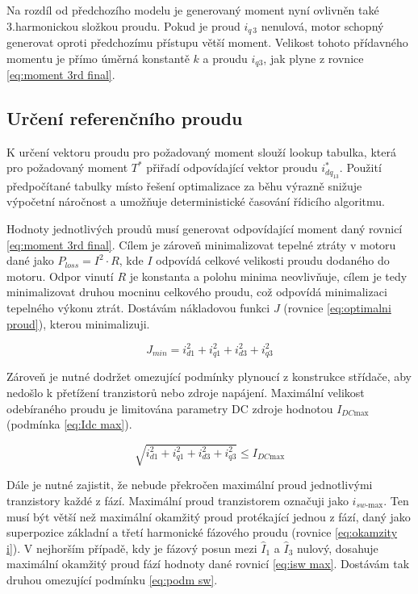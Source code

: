 Na rozdíl od předchozího modelu je generovaný moment nyní ovlivněn také 3.harmonickou složkou proudu. Pokud je proud $i_{q\,3}$ nenulová, motor schopný generovat oproti předchozímu přístupu větší moment. Velikost tohoto přídavného momentu je přímo úměrná konstantě $k$ a proudu $i_{q3}$, jak plyne z rovnice \ref{eq:moment 3rd final}. 



\subsection{Určení referenčního proudu}
K určení vektoru proudu pro požadovaný moment slouží lookup tabulka, která pro požadovaný moment $T^*$ přiřadí odpovídající vektor proudu $i_{dq_{13}}^*$. Použití předpočítané tabulky místo řešení optimalizace za běhu výrazně snižuje výpočetní náročnost a umožňuje deterministické časování řídicího algoritmu.

Hodnoty jednotlivých proudů musí generovat odpovídající moment daný  rovnicí \ref{eq:moment 3rd final}. Cílem je zároveň minimalizovat tepelné ztráty v motoru dané jako $P_{loss} = I^2 \cdot R$, kde $I$ odpovídá celkové velikosti proudu dodaného do motoru. Odpor vinutí $R$ je konstanta a polohu minima neovlivňuje, cílem je tedy minimalizovat druhou mocninu celkového proudu, což odpovídá minimalizaci tepelného výkonu ztrát. Dostávám nákladovou funkci $J$ (rovnice \ref{eq:optimalni proud}), kterou minimalizuji.

\begin{equation}
    \label{eq:optimalni proud}
    J_{min} = i_{d1}^2 + i_{q1}^2 + i_{d3}^2 + i_{q3}^2
\end{equation}

Zároveň je nutné dodržet omezující podmínky plynoucí z konstrukce střídače, aby nedošlo k přetížení tranzistorů nebo zdroje napájení. Maximální velikost odebíraného proudu je limitována parametry DC zdroje hodnotou $I_{DC\text{max}}$ (podmínka \ref{eq:Idc max}).

\begin{equation}
    \label{eq:Idc max}
    \sqrt{i_{d1}^2 + i_{q1}^2 + i_{d3}^2 + i_{q3}^2} \leq I_{DC\text{max}}
\end{equation}

Dále je nutné zajistit, že nebude překročen maximální proud jednotlivými tranzistory každé z fází. Maximální proud tranzistorem označuji jako $i_{sw\text{-max}}$. Ten musí být větší než maximální okamžitý proud protékající jednou z fází, daný jako superpozice základní a třetí harmonické fázového proudu (rovnice \ref{eq:okamzity i}). V nejhorším případě, kdy je fázový posun mezi $\hat{I}_1$ a $\hat{I}_3$ nulový, dosahuje maximální okamžitý proud fází hodnoty dané rovnicí \ref{eq:isw max}. Dostávám tak druhou omezující podmínku \ref{eq:podm sw}.

